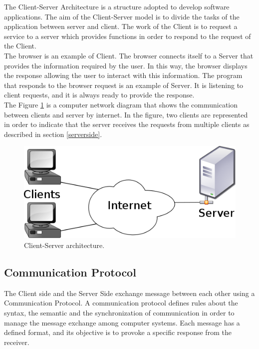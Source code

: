 \documentclass[a4paper]{report}
\begin{document}
The Client-Server Architecture is a structure adopted to develop software applications. The aim of the Client-Server model is to divide the tasks of the application between server and client. The work of the Client is to request a service to a server which provides functions in order to respond to the request of the Client.\\
The browser is an example of Client. The browser connects itself to a Server that provides the information required by the user. In this way, the browser displays the response allowing the user to interact with this information. The program that responds to the browser request is an example of Server. It is listening to client requests, and it is always ready to provide the response.\\
The Figure \ref{clientServer} is a computer network diagram that shows the communication between clients and server by internet. In the figure, two clients are represented in order to indicate that the server receives the requests from multiple clients as described in section \ref{serverside}. 

\begin{figure}[htb] 
\begin{center}
\includegraphics[scale=0.4]{figure/clientServer.png} 
\end{center}
\caption{Client-Server architecture.}
\label{clientServer}
\end{figure}

\subsection{Communication Protocol}

The Client side and the Server Side exchange message between each other using a Communication Protocol. A communication protocol defines rules about the syntax, the semantic and the synchronization of communication in order to manage the message exchange among computer systems.  Each message has a defined format, and its objective is to provoke a specific response from the receiver.\\
\end{document}
